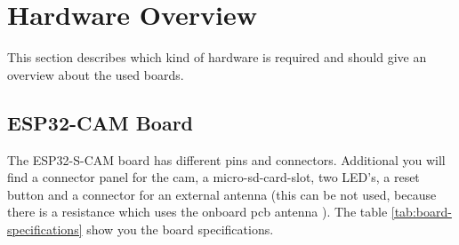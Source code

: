 \graphicspath{ {./hardware/pictures/} }
\section{Hardware Overview}
This section describes which kind of hardware is required and should give an overview about
the used boards. 

\subsection{ESP32-CAM Board}
The ESP32-S-CAM board has different pins and connectors. Additional you will find
a connector panel for the cam, a micro-sd-card-slot, two LED's, a reset button and a connector for an external antenna (this can be not used, because there is a resistance which uses the onboard pcb antenna \cite{YoutubeESP32CamAntenna}).
The table \ref{tab:board-specifications} show you the board specifications.

